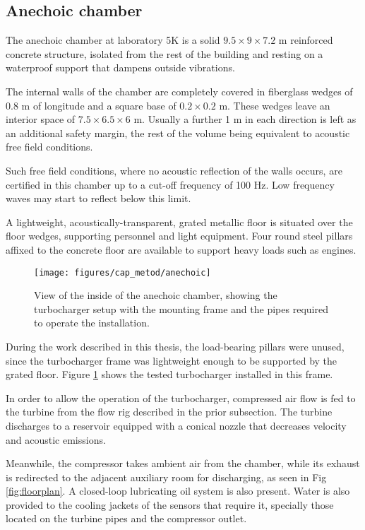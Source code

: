 \subsection{Anechoic chamber} \label{sub:anec_chamber}

The anechoic chamber at laboratory 5K is a solid $9.5 \times 9 \times 7.2$ m reinforced concrete structure, isolated from the rest of the building and resting on a waterproof support that dampens outside vibrations.

The internal walls of the chamber are completely covered in fiberglass wedges of 0.8 m of longitude and a square base of $0.2 \times 0.2$ m. These wedges leave an interior space of $7.5 \times 6.5 \times 6$ m. Usually a further 1 m in each direction is left as an additional safety margin, the rest of the volume being equivalent to acoustic free field conditions.

Such free field conditions, where no acoustic reflection of the walls occurs, are certified in this chamber up to a cut-off frequency of 100 Hz. Low frequency waves may start to reflect below this limit.

A lightweight, acoustically-transparent, grated metallic floor is situated over the floor wedges, supporting personnel and light equipment. Four round steel pillars affixed to the concrete floor are available to support heavy loads such as engines.

\begin{figure}[h!]
\centering
\texttt{[image: figures/cap\_metod/anechoic]}
\caption{View of the inside of the anechoic chamber, showing the turbocharger setup with the mounting frame and the pipes required to operate the installation.}
\label{fig:anechoic_chamber}
\end{figure}

During the work described in this thesis, the load-bearing pillars were unused, since the turbocharger frame was lightweight enough to be supported by the grated floor. Figure \ref{fig:anechoic_chamber} shows the tested turbocharger installed in this frame.

In order to allow the operation of the turbocharger, compressed air flow is fed to the turbine from the flow rig described in the prior subsection. The turbine discharges to a reservoir equipped with a conical nozzle that decreases velocity and acoustic emissions.

Meanwhile, the compressor takes ambient air from the chamber, while its exhaust is redirected to the adjacent auxiliary room for discharging, as seen in Fig \ref{fig:floorplan}. A closed-loop lubricating oil system is also present. Water is also provided to the cooling jackets of the sensors that require it, specially those located on the turbine pipes and the compressor outlet.

